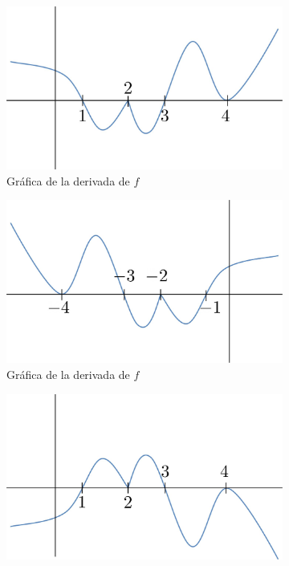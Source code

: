 \documentclass[letterpaper]{article}
\begin{document}
	\begin{figure}[ht]
		\centering
		\begin{subfigure}[l]{0.4\paperwidth}
			\includegraphics[scale=1]{img/imUno}
			\caption{Gráfica de la derivada de $ f $}
		\end{subfigure}
	\vspace{1cm}
		\begin{subfigure}[r]{0.4\textwidth}
			\includegraphics[scale=1]{img/imDos}
			\caption{Gráfica de la derivada de $ f $}
		\end{subfigure}
			\hspace{0.5cm}
		\begin{subfigure}[l]{0.4\paperwidth}
			\includegraphics[scale=1]{img/imTres}

\end{subfigure}
\end{figure}
\end{document}
